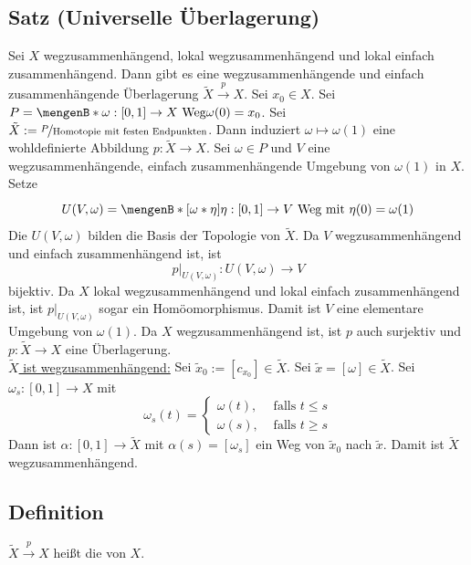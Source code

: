 \subsection{Satz (Universelle Überlagerung)} %
\label{sub:133}
Sei $X$ wegzusammenhängend, lokal wegzusammenhängend und lokal einfach zusammenhängend. Dann gibt es eine wegzusammenhängende und einfach zusammenhängende  Überlagerung 
$\tilde{X} \xrightarrow{p} X $.
Sei $x_0 \in X$. Sei $P = \set[{\omega : [0,1] \to X \text{ Weg}}]{\omega(0)=x_0} $. Sei $\tilde{X}:= \nicefrac{P}{\text{Homotopie mit festen Endpunkten}}$. Dann induziert
$\omega \mapsto \omega(1)$ eine wohldefinierte Abbildung $p : \tilde{X} \to X$. Sei $\omega \in P$ und $V$ eine wegzusammenhängende, einfach zusammenhängende Umgebung
von $\omega(1)$ in $X$. Setze 
\[
	U(V,\omega) = \set[{[\omega * \eta]}]{\rule{0cm}{1em} \eta : [0,1] \to V \text{ Weg mit } \eta(0)= \omega(1)} 
\]
Die $U(V,\omega)$ bilden die Basis der Topologie von $\tilde{X}$. Da $V$ wegzusammenhängend und einfach zusammenhängend ist, ist 
\[
	p \Big|_{U(V,\omega)} : U(V,\omega) \to V
\]
bijektiv. Da $X$ lokal wegzusammenhängend und lokal einfach zusammenhängend ist, ist $p \big|_{U(V,\omega)}$ sogar ein Homöomorphismus. Damit ist $V$ eine elementare 
Umgebung von $\omega(1)$. Da $X$ wegzusammenhängend ist, ist $p$ auch surjektiv und $p : \tilde{X} \to X$ eine Überlagerung. \smallskip \\
\uline{$\tilde{X}$ ist wegzusammenhängend:} Sei $\tilde{x}_0 := [c_{x_0}] \in \tilde{X}$. Sei $\tilde{x} = [\omega] \in \tilde{X}$. Sei $\omega_s : [0,1] \to X$ mit
\[
	\omega_s(t) = \begin{cases}
		\omega(t), &\text{ falls }t \le s\\
		\omega(s), &\text{ falls } t  \ge s
	\end{cases}
\]
Dann ist $\alpha : [0,1] \to \tilde{X}$ mit $\alpha(s) = [\omega_s]$ ein Weg von $\tilde{x}_0$ nach $\tilde{x}$. Damit ist $\tilde{X}$ wegzusammenhängend.

\subsection[Definition: Universelle Überlagerung]{Definition} %
\label{sub:134}
$\tilde{X} \xrightarrow{p} X $ heißt die  von $X$.

